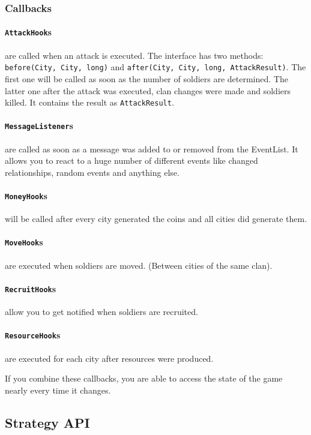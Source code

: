 \documentclass{article}
\begin{document}
\subsubsection{Callbacks}
\paragraph{\texttt{AttackHook}s} are called when an attack is executed. The interface has two methods: \texttt{before(City, City, long)} and \texttt{after(City, City, long, AttackResult)}. The first one will
be called as soon as the number of soldiers are determined. The latter one after the attack was executed, clan changes were made and soldiers killed. It contains the result as \texttt{AttackResult}.
\paragraph{\texttt{MessageListener}s} are called as soon as a message was added to or removed from the EventList. It allows you to react to a huge number of different events like changed relationships, random events and anything else.
\paragraph{\texttt{MoneyHook}s} will be called after every city generated the coins and all cities did generate them.
\paragraph{\texttt{MoveHook}s} are executed when soldiers are moved. (Between cities of the same clan).  
\paragraph{\texttt{RecruitHook}s} allow you to get notified when soldiers are recruited.
\paragraph{\texttt{ResourceHook}s} are executed for each city after resources were produced.\newline

If you combine these callbacks, you are able to access the state of the game nearly every time it changes.
\subsection{Strategy API}
\end{document}
